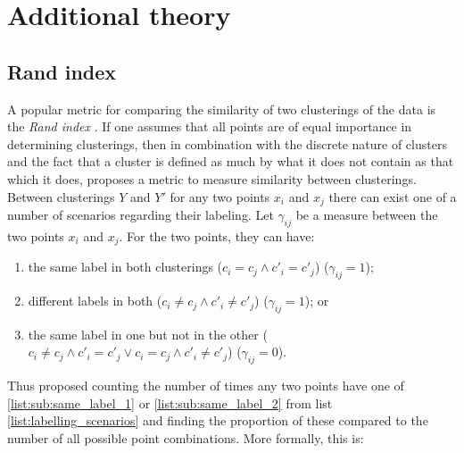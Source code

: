 \documentclass[12pt]{article} %
\begin{document}
	\newpage



%	
	
%	
	
%	
	
	

\newpage

\appendix

\section{Additional theory}

\subsection{Rand index} \label{sec:rand_index}
A popular metric for comparing the similarity of two clusterings of the data is the \emph{Rand index} \cite{RandObjectiveCriteriaEvaluation1971}. 	If one assumes that all points are of equal importance in determining clusterings, then in combination with the discrete nature of clusters and the fact that a cluster is defined as much by what it does not contain as that which it does, \citet{RandObjectiveCriteriaEvaluation1971} proposes a metric to measure similarity between clusterings. Between clusterings $Y$ and $Y'$ for any two points $x_i$ and $x_j$ there can exist one of a number of scenarios regarding their labeling. Let $\gamma_{ij}$ be a measure between the two points $x_i$ and $x_j$. For the two points, they can have:
\begin{enumerate} \label{list:labelling_scenarios}
	\item the same label in both clusterings ($c_i = c_j \land c'_i = c'_j$) ($\gamma_{ij}=1$); \label{list:sub:same_label_1}
	\item different labels in both ($c_i \neq c_j \land c'_i \neq c'_j$) ($\gamma_{ij}=1$); or \label{list:sub:same_label_2}
	\item the same label in one but not in the other ($c_i \neq c_j \land c'_i = c'_j \lor c_i = c_j \land c'_i \neq c'_j$) ($\gamma_{ij}=0$). \label{list:sub:different_label}
\end{enumerate}
Thus \citet{RandObjectiveCriteriaEvaluation1971} proposed counting the number of times any two points have one of \ref{list:sub:same_label_1} or \ref{list:sub:same_label_2} from list \ref{list:labelling_scenarios} and finding the proportion of these compared to the number of all possible point combinations. More formally, this is:
\end{document}
